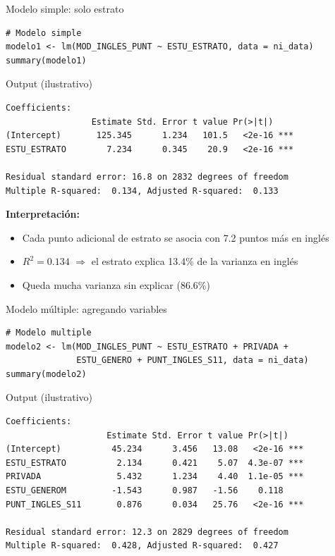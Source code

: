 \documentclass[aspectratio=169, 11pt]{beamer}
\begin{document}
\begin{frame}[fragile]{Modelo simple: solo estrato}
\begin{lstlisting}
# Modelo simple
modelo1 <- lm(MOD_INGLES_PUNT ~ ESTU_ESTRATO, data = ni_data)
summary(modelo1)
\end{lstlisting}

\vspace{0.3cm}
\begin{exampleblock}{Output (ilustrativo)}
\tiny
\begin{verbatim}
Coefficients:
                 Estimate Std. Error t value Pr(>|t|)
(Intercept)       125.345      1.234   101.5   <2e-16 ***
ESTU_ESTRATO        7.234      0.345    20.9   <2e-16 ***

Residual standard error: 16.8 on 2832 degrees of freedom
Multiple R-squared:  0.134,	Adjusted R-squared:  0.133
\end{verbatim}
\end{exampleblock}

\textbf{Interpretación:}
\begin{itemize}
\item Cada punto adicional de estrato se asocia con 7.2 puntos más en inglés
\item $R^2 = 0.134$ $\Rightarrow$ el estrato explica 13.4\% de la varianza en inglés
\item Queda mucha varianza sin explicar (86.6\%)
\end{itemize}
\end{frame}

\begin{frame}[fragile]{Modelo múltiple: agregando variables}
\begin{lstlisting}
# Modelo multiple
modelo2 <- lm(MOD_INGLES_PUNT ~ ESTU_ESTRATO + PRIVADA +
              ESTU_GENERO + PUNT_INGLES_S11, data = ni_data)
summary(modelo2)
\end{lstlisting}

\vspace{0.2cm}
\begin{exampleblock}{Output (ilustrativo)}
\tiny
\begin{verbatim}
Coefficients:
                    Estimate Std. Error t value Pr(>|t|)
(Intercept)          45.234      3.456   13.08   <2e-16 ***
ESTU_ESTRATO          2.134      0.421    5.07  4.3e-07 ***
PRIVADA               5.432      1.234    4.40  1.1e-05 ***
ESTU_GENEROM         -1.543      0.987   -1.56    0.118
PUNT_INGLES_S11       0.876      0.034   25.76   <2e-16 ***

Residual standard error: 12.3 on 2829 degrees of freedom
Multiple R-squared:  0.428,	Adjusted R-squared:  0.427
\end{verbatim}
\end{exampleblock}
\end{frame}
\end{document}
